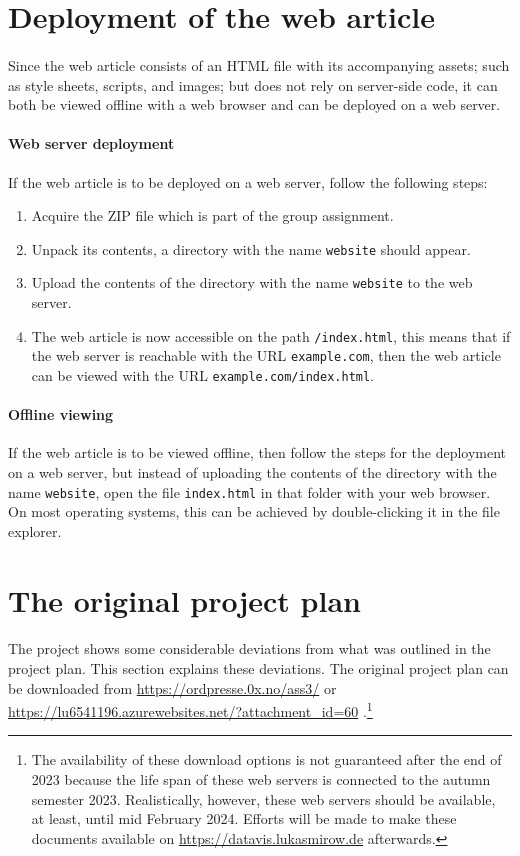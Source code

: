 \documentclass[12pt, a4paper]{article}
\begin{document}
	\section{Deployment of the web article}
		\paragraph{}
			Since the web article consists of an HTML file with its accompanying assets; such as style sheets, scripts, and images; but does not rely on server-side code, it can both be viewed offline with a web browser and can be deployed on a web server.
		\paragraph{Web server deployment}
			If the web article is to be deployed on a web server, follow the following steps:
			\begin{enumerate}
				\item Acquire the ZIP file which is part of the group assignment.
				\item Unpack its contents, a directory with the name \texttt{website} should appear.
				\item Upload the contents of the directory with the name \texttt{website} to the web server.
				\item The web article is now accessible on the path \texttt{/index.html}, this means that if the web server is reachable with the URL \texttt{example.com}, then the web article can be viewed with the URL \texttt{example.com/index.html}.
			\end{enumerate}
		\paragraph{Offline viewing}
			If the web article is to be viewed offline, then follow the steps for the deployment on a web server, but instead of uploading the contents of the directory with the name \texttt{website}, open the file \texttt{index.html} in that folder with your web browser. On most operating systems, this can be achieved by double-clicking it in the file explorer.
	\section{The original project plan}
		\paragraph{}
			The project shows some considerable deviations from what was outlined in the project plan. This section explains these deviations. The original project plan can be downloaded from \href{https://ordpresse.0x.no/ass3/}{https://ordpresse.0x.no/ass3/} or \href{https://lu6541196.azurewebsites.net/?attachment\_id=60}{https://lu6541196.azurewebsites.net/?attachment\_id=60} .\footnote{The availability of these download options is not guaranteed after the end of 2023 because the life span of these web servers is connected to the autumn semester 2023. Realistically, however, these web servers should be available, at least, until mid February 2024. Efforts will be made to make these documents available on \href{https://datavis.lukasmirow.de}{https://datavis.lukasmirow.de} afterwards.}
\end{document}
